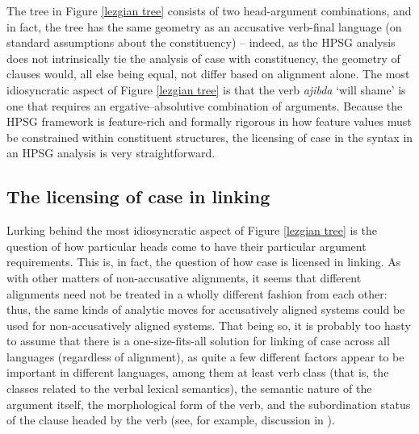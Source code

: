 \documentclass[output=paper
                ,modfonts
                ,nonflat
	        ,collection
	        ,collectionchapter
	        ,collectiontoclongg
 	        ,biblatex
                ,babelshorthands
                ,newtxmath
                ,draftmode
                ,colorlinks, citecolor=brown
]{./langsci/langscibook}
\begin{document}
{The tree in Figure \ref{lezgian tree} consists of two head-argument combinations, and in fact, the tree has the same geometry as an accusative verb-final language (on standard assumptions about the constituency) -- indeed, as the HPSG analysis does not intrinsically tie the analysis of case with constituency, the geometry of clauses would, all else being equal, not differ based on alignment alone. The most idiosyncratic aspect of Figure \ref{lezgian tree} is that the verb \textit{ajibda} `will shame' is one that requires an ergative--absolutive combination of arguments. Because the HPSG framework is feature-rich and formally rigorous in how feature values must be constrained within constituent structures, the licensing of case in the syntax in an HPSG analysis is very straightforward.    	

\subsection{The licensing of case in linking}
 
Lurking behind the most idiosyncratic aspect of Figure \ref{lezgian tree} is the question of  how particular heads come to have their particular argument requirements. This is, in fact,  the question of how case is licensed in linking. As with other matters of non-accusative alignments, it seems that different alignments need not be treated in a wholly different fashion from each other: thus, the same kinds of analytic moves for accusatively aligned systems could be used for non-accusatively aligned systems. That being so, it is probably too hasty to assume that there is a one-size-fits-all solution for linking of case across all languages (regardless of alignment), as quite a few different factors appear to be important in different languages, among them at least verb class (that is, the classes related to the verbal lexical semantics), the semantic nature of the argument itself, the morphological form of the verb, and the subordination status of the clause headed by the verb (see, for example, discussion in \citealt{dixon94}).     

}
\end{document}
